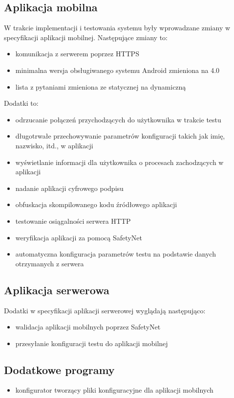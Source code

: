 \documentclass{report}
\begin{document}
			\subsection{Aplikacja mobilna}
			W trakcie implementacji i testowania systemu były wprowadzane zmiany w specyfikacji aplikacji mobilnej. Następujące zmiany to:
			\begin{itemize}
				\item komunikacja z serwerem poprzez HTTPS
				\item minimalna wersja obsługiwanego systemu Android zmieniona na 4.0
				\item lista z pytaniami zmieniona ze statycznej na dynamiczną
			\end{itemize}
			Dodatki to:
			\begin{itemize}
				\item odrzucanie połączeń przychodzących do użytkownika w trakcie testu
				\item długotrwałe przechowywanie parametrów konfiguracji takich jak imię, nazwisko, itd., w aplikacji
				\item wyświetlanie informacji dla użytkownika o procesach zachodzących w aplikacji
				\item nadanie aplikacji cyfrowego podpisu
				\item obfuskacja skompilowanego kodu źródłowego aplikacji
				\item testowanie osiągalności serwera HTTP
				\item weryfikacja aplikacji za pomocą SafetyNet
				\item automatyczna konfiguracja parametrów testu na podstawie danych otrzymanych z serwera
			\end{itemize}
		
			\subsection{Aplikacja serwerowa}
			Dodatki w specyfikacji aplikacji serwerowej wyglądają następująco:
			\begin{itemize}
				\item walidacja aplikacji mobilnych poprzez SafetyNet
				\item przesyłanie konfiguracji testu do aplikacji mobilnej
			\end{itemize}
		
			\subsection{Dodatkowe programy}
			\begin{itemize}
				\item konfigurator tworzący pliki konfiguracyjne dla aplikacji mobilnych
			\end{itemize}
	
\end{document}

